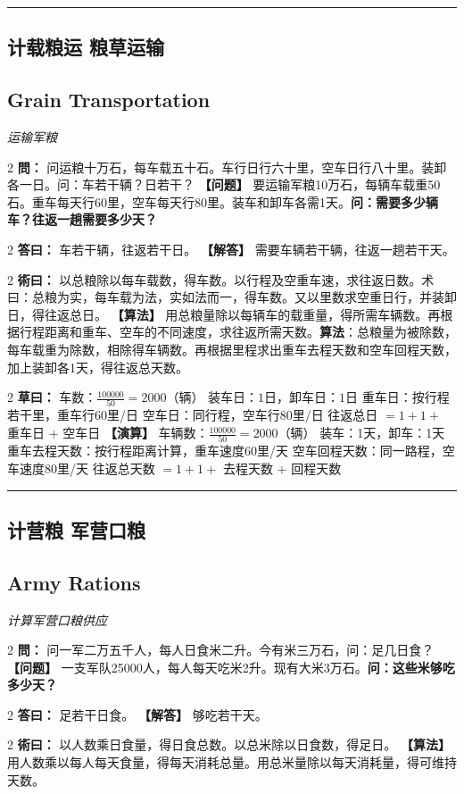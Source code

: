 \documentclass[11pt,a4paper]{article}
\newcommand{\longline}{\noindent\rule{\textwidth}{0.4pt}}
\newcommand{\bilingualProblem}[2]{%
  \vspace{0.6em}%
  \begin{paracol}{2}%
  \noindent\textcolor{problemcolor}{\textbf{問：}}#1%
  \switchcolumn%
  \noindent\textcolor{problemcolor}{\textbf{【问题】}}#2%
  \end{paracol}%
  \vspace{0.3em}%
}
\newcommand{\bilingualAnswer}[2]{%
  \begin{paracol}{2}%
  \noindent\textcolor{answercolor}{\textbf{答曰：}}#1%
  \switchcolumn%
  \noindent\textcolor{answercolor}{\textbf{【解答】}}#2%
  \end{paracol}%
  \vspace{0.3em}%
}
\newcommand{\bilingualMethod}[2]{%
  \begin{paracol}{2}%
  \noindent\textcolor{methodcolor}{\textbf{術曰：}}#1%
  \switchcolumn%
  \noindent\textcolor{methodcolor}{\textbf{【算法】}}#2%
  \end{paracol}%
  \vspace{0.3em}%
}
\newcommand{\bilingualWorking}[2]{%
  \begin{paracol}{2}%
  \noindent\textcolor{workingcolor}{\textbf{草曰：}}#1%
  \switchcolumn%
  \noindent\textcolor{workingcolor}{\textbf{【演算】}}#2%
  \end{paracol}%
  \vspace{0.3em}%
}
\newcommand{\bilingualSubsection}[2]{%
  \subsection{#1}
  \begin{center}
  {\small\color{sectioncolor}\textit{#2}}
  \end{center}
  \vspace{0.3em}
}
\begin{document}
\vspace{0.5em}
\longline

\subsection{计载粮运 \quad 粮草运输}
\bilingualSubsection{Grain Transportation}{运输军粮}

\bilingualProblem{%
问运粮十万石，每车载五十石。车行日行六十里，空车日行八十里。装卸各一日。问：车若干辆？日若干？%
}{%
要运输军粮10万石，每辆车载重50石。重车每天行60里，空车每天行80里。装车和卸车各需1天。\textbf{问：需要多少辆车？往返一趟需要多少天？}%
}

\bilingualAnswer{%
车若干辆，往返若干日。%
}{%
需要车辆若干辆，往返一趟若干天。%
}

\bilingualMethod{%
以总粮除以每车载数，得车数。以行程及空重车速，求往返日数。术曰：总粮为实，每车载为法，实如法而一，得车数。又以里数求空重日行，并装卸日，得往返总日。%
}{%
用总粮量除以每辆车的载重量，得所需车辆数。再根据行程距离和重车、空车的不同速度，求往返所需天数。\textbf{算法}：总粮量为被除数，每车载重为除数，相除得车辆数。再根据里程求出重车去程天数和空车回程天数，加上装卸各1天，得往返总天数。%
}

\bilingualWorking{%
车数：$\displaystyle\frac{100000}{50} = 2000$（辆）
装车日：$1$日，卸车日：$1$日
重车日：按行程若干里，重车行$60$里/日
空车日：同行程，空车行$80$里/日
往返总日 $= 1 + 1 +$ 重车日 $+$ 空车日%
}{%
车辆数：$\displaystyle\frac{100000}{50} = 2000$（辆）
装车：1天，卸车：1天
重车去程天数：按行程距离计算，重车速度60里/天
空车回程天数：同一路程，空车速度80里/天
往返总天数 $= 1 + 1 +$ 去程天数 $+$ 回程天数%
}

\vspace{0.5em}
\longline

\subsection{计营粮 \quad 军营口粮}
\bilingualSubsection{Army Rations}{计算军营口粮供应}

\bilingualProblem{%
问一军二万五千人，每人日食米二升。今有米三万石，问：足几日食？%
}{%
一支军队25000人，每人每天吃米2升。现有大米3万石。\textbf{问：这些米够吃多少天？}%
}

\bilingualAnswer{%
足若干日食。%
}{%
够吃若干天。%
}

\bilingualMethod{%
以人数乘日食量，得日食总数。以总米除以日食数，得足日。%
}{%
用人数乘以每人每天食量，得每天消耗总量。用总米量除以每天消耗量，得可维持天数。%
}
\end{document}
